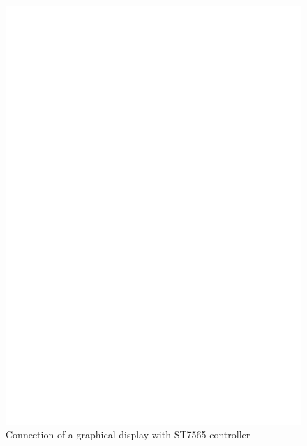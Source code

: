 \begin{figure}[H]
\centering
\includegraphics[width=14cm]{../FIG/ST7565lcd.eps}
\caption{Connection of a graphical display with ST7565 controller}
\label{fig:ST7565lcd}
\end{figure}

